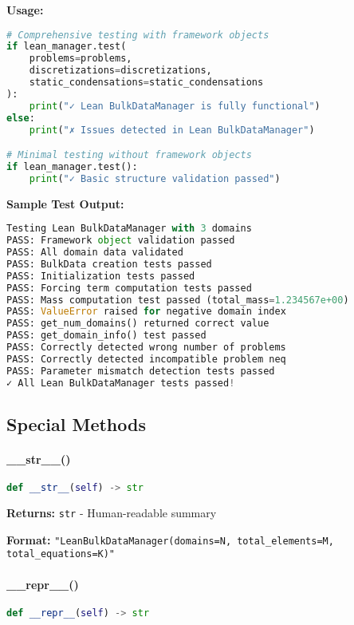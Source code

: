 \textbf{Usage:}
\begin{lstlisting}[language=Python, caption=Test Method Usage]
# Comprehensive testing with framework objects
if lean_manager.test(
    problems=problems,
    discretizations=discretizations,
    static_condensations=static_condensations
):
    print("✓ Lean BulkDataManager is fully functional")
else:
    print("✗ Issues detected in Lean BulkDataManager")

# Minimal testing without framework objects
if lean_manager.test():
    print("✓ Basic structure validation passed")
\end{lstlisting}

\textbf{Sample Test Output:}
\begin{lstlisting}[language=Python, caption=Sample Test Output]
Testing Lean BulkDataManager with 3 domains
PASS: Framework object validation passed
PASS: All domain data validated
PASS: BulkData creation tests passed
PASS: Initialization tests passed
PASS: Forcing term computation tests passed
PASS: Mass computation test passed (total_mass=1.234567e+00)
PASS: ValueError raised for negative domain index
PASS: get_num_domains() returned correct value
PASS: get_domain_info() test passed
PASS: Correctly detected wrong number of problems
PASS: Correctly detected incompatible problem neq
PASS: Parameter mismatch detection tests passed
✓ All Lean BulkDataManager tests passed!
\end{lstlisting}

\subsection{Special Methods}
\label{subsec:special_methods}

\paragraph{\_\_str\_\_()}\leavevmode
\begin{lstlisting}[language=Python, caption=String Representation Method]
def __str__(self) -> str
\end{lstlisting}

\textbf{Returns:} \texttt{str} - Human-readable summary

\textbf{Format:} \texttt{"LeanBulkDataManager(domains=N, total\_elements=M, total\_equations=K)"}

\paragraph{\_\_repr\_\_()}\leavevmode
\begin{lstlisting}[language=Python, caption=Repr Method]
def __repr__(self) -> str
\end{lstlisting}

